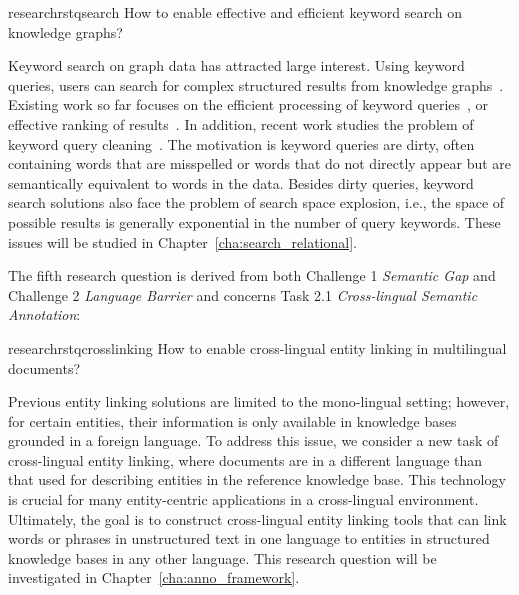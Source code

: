 \begin{restatable}{research}{rstqsearch} \label{q:search}
How to enable effective and efficient keyword search on knowledge graphs?
\end{restatable}
\vspace{-0.9em}
Keyword search on graph data has attracted large interest. Using keyword queries, users can search for complex structured results from knowledge graphs~\cite{}. Existing work so far focuses on the efficient processing of keyword queries~\cite{}, or effective ranking of results~\cite{}. In addition, recent work studies the problem of keyword query cleaning~\cite{}. The motivation is keyword queries are dirty, often containing words that are misspelled or words that do not directly appear but are semantically equivalent to words in the data. Besides dirty queries, keyword search solutions also face the problem of search space explosion, i.e., the space of possible results is generally exponential in the number of query keywords. These issues will be studied in Chapter~\ref{cha:search_relational}.

\noindent The fifth research question is derived from both Challenge 1 \emph{Semantic Gap} and Challenge 2 \emph{Language Barrier} and concerns Task 2.1 \emph{Cross-lingual Semantic Annotation}:

\begin{restatable}{research}{rstqcrosslinking} \label{q:crosslinking}
How to enable cross-lingual entity linking in multilingual documents?
\end{restatable}
\vspace{-0.9em}
Previous entity linking solutions are limited to the mono-lingual setting; however, for certain entities, their information is only available in knowledge bases grounded in a foreign language. To address this issue, we consider a new task of cross-lingual entity linking, where documents are in a different language than that used for describing entities in the reference knowledge base. This technology is crucial for many entity-centric applications in a cross-lingual environment. Ultimately, the goal is to construct cross-lingual entity linking tools that can link words or phrases in unstructured text in one language to entities in structured knowledge bases in any other language.
This research question will be investigated in Chapter~\ref{cha:anno_framework}. 

